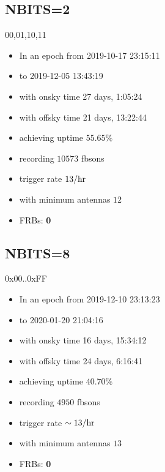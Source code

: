 
\subsection {NBITS=2}
\begin{frame}{00,01,10,11}
\begin{itemize}
	\item In an epoch from \hfill 2019-10-17 23:15:11
	\item to \hfill 2019-12-05 13:43:19
	\item with onsky time \hfill 27 days, 1:05:24
	\item with offsky time \hfill 21 days, 13:22:44
	\item achieving uptime \hfill $55.65\%$
	\item recording \hfill $10573$ fbsons
	\item trigger rate \hfill $13/{\rm hr}$
	\item with minimum antennas \hfill $12$
	\item FRBs: \hfill \textbf{\Large 0}
\end{itemize}
\end{frame}

\subsection {NBITS=8}
\begin{frame}{0x00..0xFF}
\begin{itemize}
	\item In an epoch from          \hfill 2019-12-10 23:13:23
	\item to                        \hfill 2020-01-20 21:04:16 
	\item with onsky time           \hfill 16 days, 15:34:12 
	\item with offsky time          \hfill 24 days, 6:16:41
	\item achieving uptime          \hfill $40.70\%$
	\item recording                 \hfill $4950$ fbsons
	\item trigger rate              \hfill $\sim 13/{\rm hr}$
	\item with minimum antennas     \hfill $13$
	\item FRBs:                     \hfill \textbf{\Large 0}
\end{itemize}
\end{frame}

